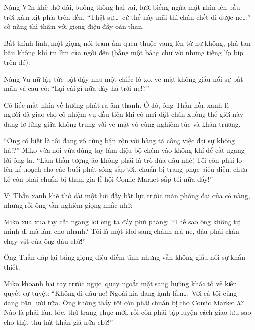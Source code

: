 \documentclass[../main.tex]{subfiles}
\begin{document}
Nàng Vữn khẽ thở dài, buông thõng hai vai, lười biếng ngửa mặt nhìn lên bầu trời xám xịt phía trên đền. ``Thật sự\dots\ cứ thế này mãi thì chán chết đi được ne\dots'' cô nàng thì thầm với giọng điệu đầy oán than.

Bất thình lình, một giọng nói trầm ấm quen thuộc vang lên từ hư không, phá tan bầu không khí im lìm của ngôi đền (bằng một bảng chữ với những tiếng líp bíp trên đó):


Nàng Vu nữ lập tức bật dậy như một chiếc lò xo, vẻ mặt không giấu nổi sự bất mãn và cau có: ``Lại cái gì nữa đây hả trời ne!?''

Cô liếc mắt nhìn về hướng phát ra âm thanh. Ở đó, ông Thần hồn xanh lè - người đã giao cho cô nhiệm vụ đầu tiên khi cô mới đặt chân xuống thế giới này - đang lơ lửng giữa không trung với vẻ mặt vô cùng nghiêm túc và khẩn trương.

``Ông có biết là tôi đang vô cùng bận rộn với hàng tá công việc đại sự không hả!?'' Miko vừa nói vừa dùng tay làm điệu bộ chém vào không khí để cắt ngang lời ông ta. ``Làm thần tượng ảo không phải là trò đùa đâu nhé! Tôi còn phải lo lên kế hoạch cho các buổi phát sóng sắp tới, chuẩn bị trang phục biểu diễn, chưa kể còn phải chuẩn bị tham gia lễ hội Comic Market sắp tới nữa đấy!''

Vị Thần xanh khẽ thở dài một hơi đầy bất lực trước màn phóng đại của cô nàng, nhưng rồi ông vẫn nghiêm giọng nhắc nhở:


Miko xua xua tay cắt ngang lời ông ta đầy phũ phàng: ``Thế sao ông không tự mình đi mà làm cho nhanh? Tôi là một idol sang chảnh mà ne, đâu phải chân chạy vặt của ông đâu chứ!''

Ông Thần đáp lại bằng giọng điệu điềm tĩnh nhưng vẫn không giấu nổi sự khẩn thiết:


Miko khoanh hai tay trước ngực, quay ngoắt mặt sang hướng khác tỏ vẻ kiên quyết cự tuyệt: ``Không đi đâu ne! Ngoài kia đang lạnh lắm\dots\ Với cả tôi cũng đang bận lười nữa. Ông không thấy tôi còn phải chuẩn bị cho Comic Market à? Nào là phải làm tóc, thử trang phục mới, rồi còn phải tập luyện cách giao lưu sao cho thật thu hút khán giả nữa chứ!''
\end{document}
